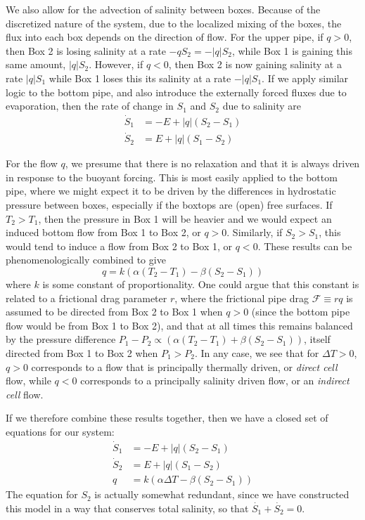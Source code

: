 \documentclass[letterpaper, 11pt]{article}
\begin{document}
We also allow for the advection of salinity between boxes. Because of the discretized nature of the system, due to the localized mixing of the boxes, the flux into each box depends on the direction of flow. For the upper pipe, if $q > 0$, then Box 2 is losing salinity at a rate $-q S_2 = -|q| S_2$, while Box 1 is gaining this same amount, $|q| S_2$. However, if $q < 0$, then Box 2 is now gaining salinity at a rate $|q| S_1$ while Box 1 loses this its salinity at a rate $-|q| S_1$. If we apply similar logic to the bottom pipe, and also introduce the externally forced fluxes due to evaporation, then the rate of change in $S_1$ and $S_2$ due to salinity are
\begin{align*}
\dot{S}_1 &= -E + |q|(S_2 - S_1) \\
\dot{S}_2 &=  E + |q|(S_1 - S_2)
\end{align*}

For the flow $q$, we presume that there is no relaxation and that it is always driven in response to the buoyant forcing. This is most easily applied to the bottom pipe, where we might expect it to be driven by the differences in hydrostatic pressure between boxes, especially if the boxtops are (open) free surfaces. If $T_2 > T_1$, then the pressure in Box 1 will be heavier and we would expect an induced bottom flow from Box 1 to Box 2, or $q > 0$. Similarly, if $S_2 > S_1$, this would tend to induce a flow from Box 2 to Box 1, or $q < 0$. These results can be phenomenologically combined to give
\begin{equation*}
q = k (\alpha (T_2 - T_1) - \beta (S_2 - S_1))
\end{equation*}
where $k$ is some constant of proportionality. One could argue that this constant is related to a frictional drag parameter $r$, where the frictional pipe drag $\mathcal{F} \equiv r q$ is assumed to be directed from Box 2 to Box 1 when $q > 0$ (since the bottom pipe flow would be from Box 1 to Box 2), and that at all times this remains balanced by the pressure difference $P_1 - P_2 \propto (\alpha(T_2 - T_1) + \beta(S_2 - S_1))$, itself directed from Box 1 to Box 2 when $P_1 > P_2$. In any case, we see that for $\Delta T > 0$, $q > 0$ corresponds to a flow that is principally thermally driven, or \emph{direct cell} flow, while $q < 0$ corresponds to a principally salinity driven flow, or an \emph{indirect cell} flow.

If we therefore combine these results together, then we have a closed set of equations for our system:
\begin{subequations}
\begin{align}
\dot{S}_1 &= -E + |q|(S_2 - S_1) \\
\dot{S}_2 &=  E + |q|(S_1 - S_2) \\
q &= k (\alpha \Delta T - \beta (S_2 - S_1))
\end{align}
\end{subequations}
The equation for $S_2$ is actually somewhat redundant, since we have constructed this model in a way that conserves total salinity, so that $\dot{S_1} + \dot{S_2} = 0$.
\end{document}
